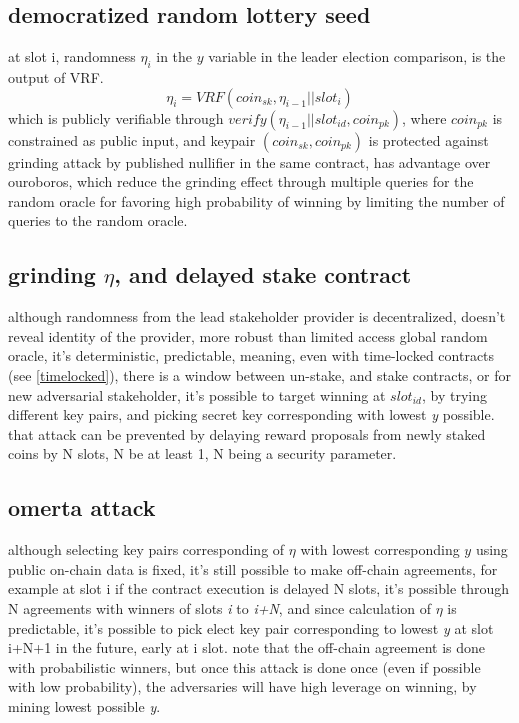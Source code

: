 \documentclass{article}
\begin{document}
\subsection{democratized random lottery seed}
at slot i, randomness $\eta_i$ in the $y$ variable in the leader election comparison, is the output of VRF.
$$\eta_i=VRF(coin_{sk}, \eta_{i-1}||slot_{i})$$  which is publicly verifiable through $verify(\eta_{i-1}||slot_{id}, coin_{pk})$, where $coin_{pk}$ is constrained as public input, and keypair $(coin_{sk},coin_{pk})$ is protected against grinding attack by published nullifier in the same contract, has advantage over ouroboros, which reduce the grinding effect through multiple queries for the random oracle for favoring high probability of winning by limiting the number of queries to the random oracle.  \cite{ouroboros_genesis}

\subsection {grinding $\eta$, and delayed stake contract}
although randomness from the lead stakeholder provider is decentralized, doesn't reveal identity of the provider, more robust than limited access global random oracle, it's deterministic, predictable, meaning, even with time-locked contracts (see \ref{timelocked}), there is a window between un-stake, and stake contracts, or for new adversarial stakeholder, it's possible to target winning at $slot_{id}$, by trying different key pairs, and picking secret key corresponding with lowest \emph{y} possible.
that attack can be prevented by delaying reward proposals from newly staked coins by N slots, N be at least 1, N being a security parameter.

\subsection {omerta attack}
although selecting key pairs corresponding of $\eta$ with lowest corresponding $y$ using public on-chain data is fixed, it's still possible to make off-chain agreements, for example at slot i if the contract execution is delayed N slots, it's possible through N agreements with winners of slots \emph{i} to \emph{i+N}, and since calculation of $\eta$ is predictable, it's possible to pick elect key pair corresponding to lowest \emph{y} at slot i+N+1 in the future, early at i slot.
note that the off-chain agreement is done with probabilistic winners, but once this attack is done once (even if possible with low probability), the adversaries will have high leverage on winning, by mining lowest possible \emph{y}.
\end{document}
